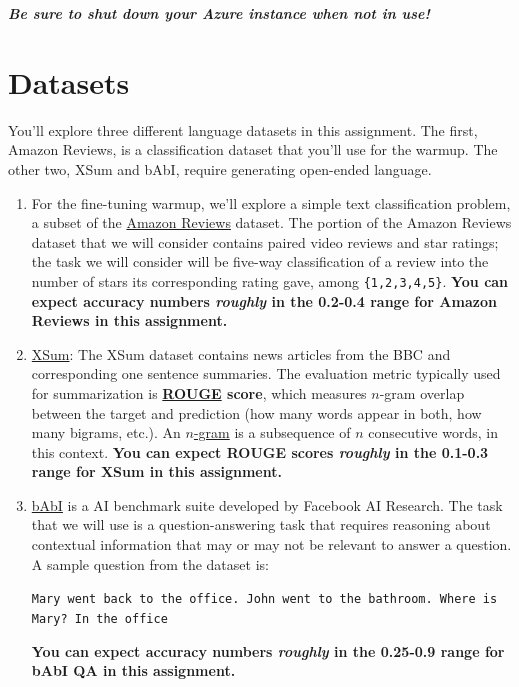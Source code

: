 \documentclass[12pt]{article}
\begin{document}
        {
        \begin{center}
            \large
            \textbf{\textit{Be sure to shut down your Azure instance when not in use!}}
        \end{center}
    }

    \section*{Datasets}

    You'll explore three different language datasets in this assignment. The first, Amazon Reviews, is a classification dataset that you'll use for the warmup. The other two, XSum and bAbI, require generating open-ended language.

    \begin{enumerate}
        \item For the fine-tuning warmup, we'll explore a simple text classification problem, a subset of the \href{https://huggingface.co/datasets/amazon\_us\_reviews}{Amazon Reviews} dataset. The portion of the Amazon Reviews dataset that we will consider contains paired video reviews and star ratings; the task we will consider will be five-way classification of a review into the number of stars its corresponding rating gave, among \texttt{\{1,2,3,4,5\}}. \textbf{You can expect accuracy numbers \textit{roughly} in the 0.2-0.4 range for Amazon Reviews in this assignment.}
        \item \href{https://huggingface.co/datasets/xsum}{XSum}: The XSum dataset contains news articles from the BBC and corresponding one sentence summaries. The evaluation metric typically used for summarization is \textbf{\href{https://en.wikipedia.org/wiki/ROUGE_(metric)}{ROUGE} score}, which measures $n$-gram overlap between the target and prediction (how many words appear in both, how many bigrams, etc.). An \href{https://en.wikipedia.org/wiki/N-gram#Examples}{$n$-gram} is a subsequence of $n$ consecutive words, in this context.  \textbf{You can expect ROUGE scores \textit{roughly} in the 0.1-0.3 range for XSum in this assignment.}
        \item \href{https://research.facebook.com/downloads/babi/}{bAbI} is a AI benchmark suite developed by Facebook AI Research. The task that we will use is a question-answering task that requires reasoning about contextual information that may or may not be relevant to answer a question. A sample question from the dataset is:

        \texttt{Mary went back to the office. John went to the bathroom. Where is Mary? In the office}

        \textbf{You can expect accuracy numbers \textit{roughly} in the 0.25-0.9 range for bAbI QA in this assignment.}
    \end{enumerate}
\end{document}
